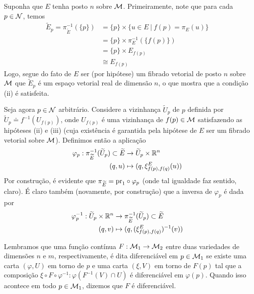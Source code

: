 \begin{dem}
Suponha que $E$ tenha posto $n$ sobre $\mathcal{M}$. Primeiramente, note que para cada $p \in \mathcal{N}$, temos
\[ \begin{aligned}
\widetilde{E}_p = \pi_{\widetilde{E}}^{-1}(\{p \}) &= \{p \} \times \{u \in E \ \vert \ f(p) = \pi_E(u) \} \\
&= \{p \} \times \pi_E^{-1}(\{f(p)\}) \\
&=  \{p \} \times E_{f(p)} \\
&\cong E_{f(p)}
\end{aligned}
\]
Logo, segue do fato de $E$ ser (por hipótese) um fibrado vetorial de posto $n$ sobre $\mathcal{M}$ que $\widetilde{E}_p$ é um espaço vetorial real de dimensão $n$, o que mostra que a condição (ii) é satisfeita. \par 
Seja agora $p \in \mathcal{N}$ arbitrário. Considere a vizinhança $\widetilde{U}_p$ de $p$ definida por $\widetilde{U}_p \doteq f^{-1}(U_{f(p)})$, onde $U_{f(p)}$ é uma vizinhança de $f(p) \in \mathcal{M}$  satisfazendo as hipóteses (ii) e (iii) (cuja existência é garantida pela hipótese de $E$ ser um fibrado vetorial sobre $\mathcal{M}$). Definimos então a aplicação 
\begin{align*}
\varphi_p : \pi_{\widetilde{E}}^{-1}(\widetilde{U}_p ) \subset \widetilde{E} &\to \widetilde{U}_p \times \mathbb{R}^n \\
(q, u) &\mapsto (q, \xi^E_{f(p), f(q)}(u))
\end{align*}
Por construção, é evidente que $\pi_{\widetilde{E}} = \text{pr}_1 \circ \varphi_p$ (onde tal igualdade faz sentido, claro). É claro também (novamente, por construção) que a inversa de $\varphi_p$ é dada por
\begin{align*}
\varphi_p^{-1} : \widetilde{U}_p \times \mathbb{R}^n &\to \pi_{\widetilde{E}}^{-1}(\widetilde{U}_p ) \subset \widetilde{E} \\
(q, v) &\mapsto (q, (\xi^E_{f(p), f(q)})^{-1}(v))
\end{align*}
\begin{oobs}
Lembramos que uma função contínua $F: \mathcal{M}_1 \to \mathcal{M}_2$ entre duas variedades de dimensões $n$ e $m$, respectivamente, é dita diferenciável em $p \in \mathcal{M}_1$ se existe uma carta $(\varphi, U)$ em torno de $p$ e uma carta $(\xi, V)$ em torno de $F(p)$ tal que a composição $\xi \circ F \circ \varphi^{-1}: \varphi(F^{-1}(V) \cap U)$ é diferenciável em $\varphi(p)$. Quando isso acontece em todo $p \in \mathcal{M}_1$, dizemos que $F$ é diferenciável.\par

\end{oobs}
\end{dem}
